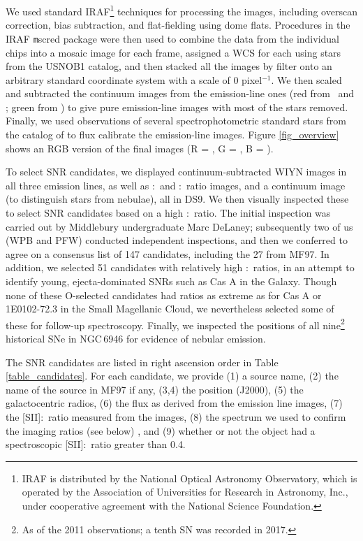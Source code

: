 We used standard IRAF\footnote{IRAF is distributed by the National Optical Astronomy Observatory, which is operated by the Association of Universities for Research in Astronomy, Inc., under cooperative agreement with the National Science Foundation.} techniques for processing the images, including overscan correction, bias subtraction, and flat-fielding using dome flats.  Procedures in the IRAF {\texttt mscred} package were then used to combine the data from the individual chips into a mosaic image for each frame, assigned a WCS for each using stars from the USNOB1 catalog, and then stacked  all the images by   filter onto an arbitrary standard coordinate system with a scale of 0 pixel$^{-1}$.  We then scaled and subtracted the continuum images from the emission-line ones (red from \ha\ and \sii; green from \oiii) to give pure emission-line images with most of the stars removed.  Finally, we used observations of several spectrophotometric standard stars from the catalog of \citet{massey88} to flux calibrate the emission-line images.  Figure \ref{fig_overview} shows an RGB version of the final images (R = \ha, G = \sii, B = \oiii).

To select SNR candidates, we displayed continuum-subtracted WIYN images in all three emission lines, as well as \sii:\ha\  and \oiii:\ha\ ratio images, and a continuum image (to distinguish stars from nebulae), all in DS9.   We then visually inspected these to select SNR candidates based on a high  \sii:\ha\ ratio.  The initial inspection was carried out by Middlebury undergraduate Marc DeLaney; subsequently two of us (WPB and PFW) conducted independent inspections, and then we conferred to agree on a consensus list of 147 candidates, including the 27 from MF97.   In addition, we selected 51 candidates with relatively high \oiii:\ha\ ratios, in an attempt to identify young, ejecta-dominated SNRs such as Cas A in the Galaxy.   Though none of these O-selected candidates had ratios as extreme as for Cas A or  1E0102-72.3 in the Small Magellanic Cloud, we nevertheless selected some of these for follow-up spectroscopy.  Finally, we inspected the positions of all nine\footnote{As of the 2011 observations; a tenth SN was recorded in 2017.} historical SNe in NGC\,6946 for evidence of nebular emission. 


The SNR candidates are listed in right ascension order in Table \ref{table_candidates}.  For each candidate, we provide (1) a source name, (2) the name of the source in MF97 if any,  (3,4) the position  (J2000), (5) the galactocentric radios, (6) the \ha flux as derived from the emission line images, (7) the [SII]:\ha\ ratio measured from the images, (8) the spectrum we used to confirm the imaging ratios (see below) , and (9) whether or not the object had a spectroscopic [SII]:\ha\ ratio greater than 0.4.


